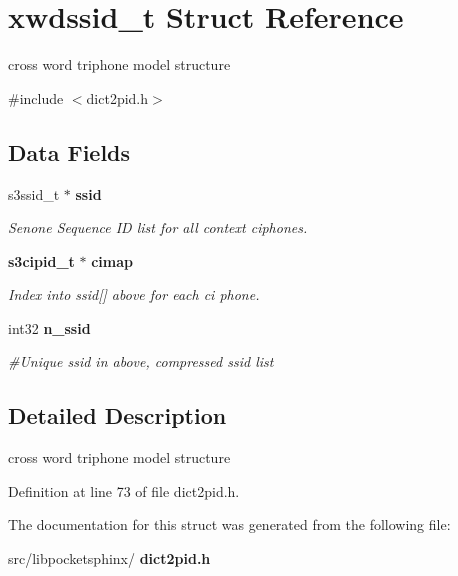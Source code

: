 \section{xwdssid\+\_\+t Struct Reference}
\label{structxwdssid__t}


cross word triphone model structure  




{\ttfamily \#include $<$dict2pid.\+h$>$}

\subsection*{Data Fields}
\begin{DoxyCompactItemize}
\item 
\mbox{\label{structxwdssid__t_adbeeda6e94a51f08626c13414cdad6a8}} 
s3ssid\+\_\+t $\ast$ \textbf{ ssid}
\begin{DoxyCompactList}\small\item\em Senone Sequence ID list for all context ciphones. \end{DoxyCompactList}\item 
\mbox{\label{structxwdssid__t_a502f9241a70383aa260d3390e4ff58fb}} 
\textbf{ s3cipid\+\_\+t} $\ast$ \textbf{ cimap}
\begin{DoxyCompactList}\small\item\em Index into ssid[] above for each ci phone. \end{DoxyCompactList}\item 
\mbox{\label{structxwdssid__t_ab4443c642c5aff57c35abed070112d6e}} 
int32 \textbf{ n\+\_\+ssid}
\begin{DoxyCompactList}\small\item\em \#\+Unique ssid in above, compressed ssid list \end{DoxyCompactList}\end{DoxyCompactItemize}


\subsection{Detailed Description}
cross word triphone model structure 

Definition at line 73 of file dict2pid.\+h.



The documentation for this struct was generated from the following file\+:\begin{DoxyCompactItemize}
\item 
src/libpocketsphinx/\textbf{ dict2pid.\+h}\end{DoxyCompactItemize}
